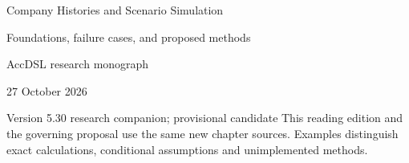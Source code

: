 \documentclass[11pt,a4paper]{report}
\begin{document}
\hypersetup{pageanchor=false}
\begin{titlepage}
{\Huge Company Histories and Scenario Simulation\par}
\vspace{12mm}
{\Large Foundations, failure cases, and proposed methods\par}
\vspace{8mm}
AccDSL research monograph\par 27 October 2026\par Version 5.30 research companion; provisional candidate
\vfill
This reading edition and the governing proposal use the same new chapter sources. Examples distinguish exact calculations, conditional assumptions and unimplemented methods.
\end{titlepage}
\hypersetup{pageanchor=true}
\tableofcontents
\clearpage{}


























\clearpage\label{sim:body-end}

\begingroup\raggedright
\endgroup
\end{document}
